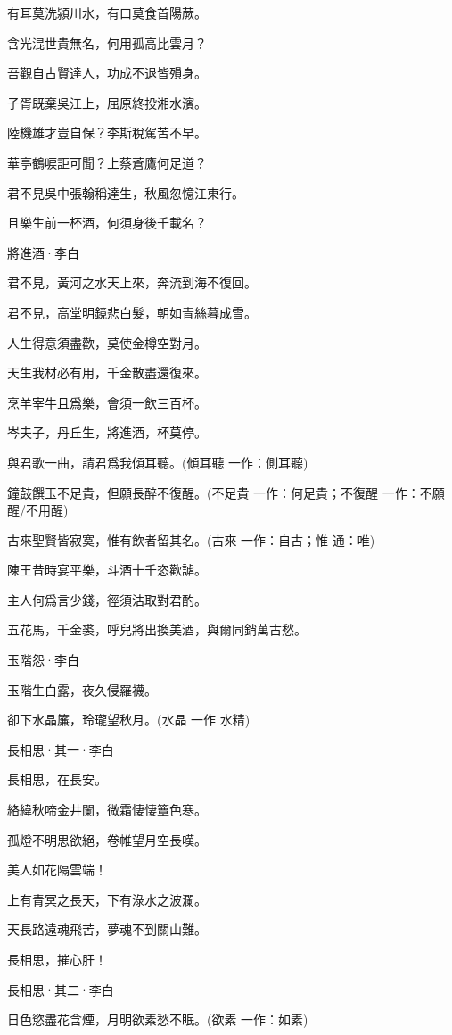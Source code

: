 \documentclass[12pt,a4paper]{ctexbook}
\begin{document}
有耳莫洗潁川水，有口莫食首陽蕨。\par
含光混世貴無名，何用孤高比雲月？\par
吾觀自古賢達人，功成不退皆殞身。\par
子胥既棄吳江上，屈原終投湘水濱。\par
陸機雄才豈自保？李斯稅駕苦不早。\par
華亭鶴唳詎可聞？上蔡蒼鷹何足道？\par
君不見吳中張翰稱達生，秋風忽憶江東行。\par
且樂生前一杯酒，何須身後千載名？\par
將進酒·李白\par
君不見，黃河之水天上來，奔流到海不復回。\par
君不見，高堂明鏡悲白髮，朝如青絲暮成雪。\par
人生得意須盡歡，莫使金樽空對月。\par
天生我材必有用，千金散盡還復來。\par
烹羊宰牛且爲樂，會須一飲三百杯。\par
岑夫子，丹丘生，將進酒，杯莫停。\par
與君歌一曲，請君爲我傾耳聽。(傾耳聽 一作：側耳聽)\par
鐘鼓饌玉不足貴，但願長醉不復醒。(不足貴 一作：何足貴；不復醒 一作：不願醒/不用醒)\par
古來聖賢皆寂寞，惟有飲者留其名。(古來 一作：自古；惟 通：唯)\par
陳王昔時宴平樂，斗酒十千恣歡謔。\par
主人何爲言少錢，徑須沽取對君酌。\par
五花馬，千金裘，呼兒將出換美酒，與爾同銷萬古愁。\par
玉階怨·李白\par
玉階生白露，夜久侵羅襪。\par
卻下水晶簾，玲瓏望秋月。(水晶 一作 水精)\par
長相思·其一·李白\par
長相思，在長安。\par
絡緯秋啼金井闌，微霜悽悽簟色寒。\par
孤燈不明思欲絕，卷帷望月空長嘆。\par
美人如花隔雲端！\par
上有青冥之長天，下有淥水之波瀾。\par
天長路遠魂飛苦，夢魂不到關山難。\par
長相思，摧心肝！\par
長相思·其二·李白\par
日色慾盡花含煙，月明欲素愁不眠。(欲素 一作：如素)\par
\end{document}
